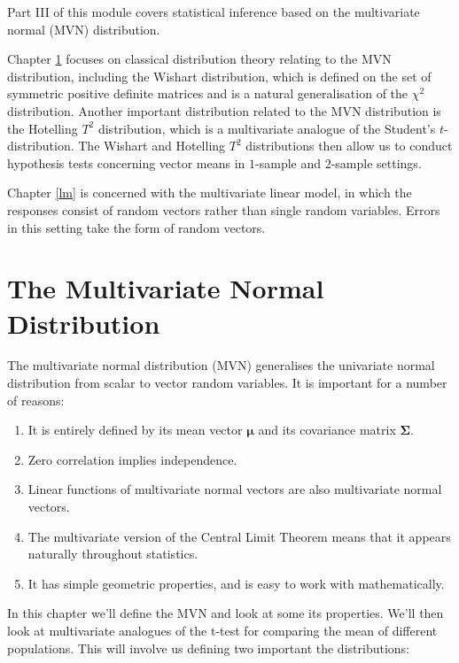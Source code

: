 \documentclass[
]{book}
\providecommand{\tightlist}{%
  \setlength{\itemsep}{0pt}\setlength{\parskip}{0pt}}
\theoremstyle{definition}
\theoremstyle{definition}
\theoremstyle{definition}
\theoremstyle{definition}
\theoremstyle{remark}
\begin{document}
Part III of this module covers statistical inference based on the multivariate normal (MVN) distribution.

Chapter \ref{multinormal} focuses on classical distribution theory relating to the MVN distribution, including the Wishart distribution, which is defined on the set of symmetric positive definite matrices and is a natural generalisation of the \(\chi^2\) distribution. Another important distribution related to the MVN distribution is the Hotelling \(T^2\) distribution, which is a multivariate analogue of the Student's \(t\)-distribution.
The Wishart and Hotelling \(T^2\) distributions then allow us to conduct hypothesis tests concerning vector means in \(1\)-sample and \(2\)-sample settings.

Chapter \ref{lm} is concerned with the multivariate linear model, in which the responses consist of random vectors rather than single random variables. Errors in this setting take the form of random vectors.

\hypertarget{multinormal}{%
\chapter{The Multivariate Normal Distribution}\label{multinormal}}

The multivariate normal distribution (MVN) generalises the univariate normal distribution from scalar to vector random variables. It is important for a number of reasons:

\begin{enumerate}
\def\labelenumi{\arabic{enumi}.}
\tightlist
\item
  It is entirely defined by its mean vector \({\boldsymbol{\mu}}\) and its covariance matrix \(\boldsymbol{\Sigma}\).
\item
  Zero correlation implies independence.
\item
  Linear functions of multivariate normal vectors are also multivariate normal vectors.
\item
  The multivariate version of the Central Limit Theorem means that it appears naturally throughout statistics.
\item
  It has simple geometric properties, and is easy to work with mathematically.
\end{enumerate}

In this chapter we'll define the MVN and look at some its properties. We'll then look at multivariate analogues of the t-test for comparing the mean of different populations. This will involve us defining two important the distributions:
\end{document}
